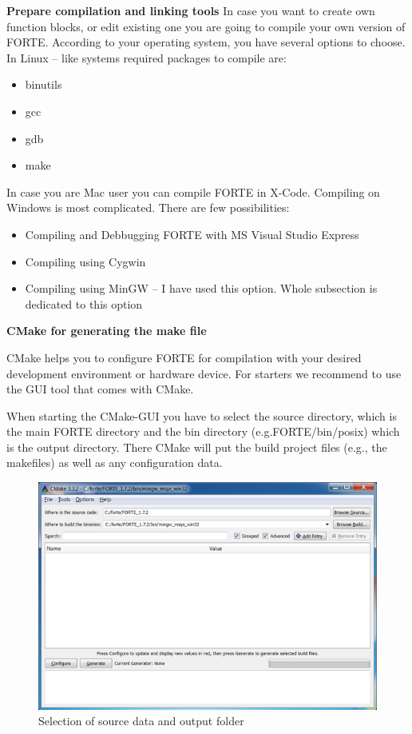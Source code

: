 \textbf{Prepare compilation and linking tools
}In case you want to create own function blocks, or edit existing one you are going to compile your own version of FORTE. According to your operating system, you have several options to choose. 
In Linux – like systems required packages to compile are:
\begin{itemize}
	\item binutils 
	\item gcc 
	\item gdb
	\item make
\end{itemize}
In case you are Mac user you can compile FORTE in X-Code. 
Compiling on Windows is most complicated. There are few possibilities:
\begin{itemize}
	\item Compiling and Debbugging FORTE with MS Visual Studio Express
	\item Compiling using Cygwin 
	\item Compiling using MinGW – I have used this option. Whole subsection is dedicated to this option
\end{itemize}

\textbf{CMake for generating the make file}

CMake helps you to configure FORTE for compilation with your desired development environment or hardware device. For starters we recommend to use the GUI tool that comes with CMake.

When starting the CMake-GUI you have to select the source directory, which is the main FORTE directory and the bin directory (e.g.FORTE/bin/posix) which is the output directory. There CMake will put the build project files (e.g., the makefiles) as well as any configuration data. 


\begin{figure}
\centering
\includegraphics{Figures/cmake-1}
\decoRule
\caption[CMake step 1]{Selection of source data and output folder}
\label{fig:cmake-1}
\end{figure}
 
